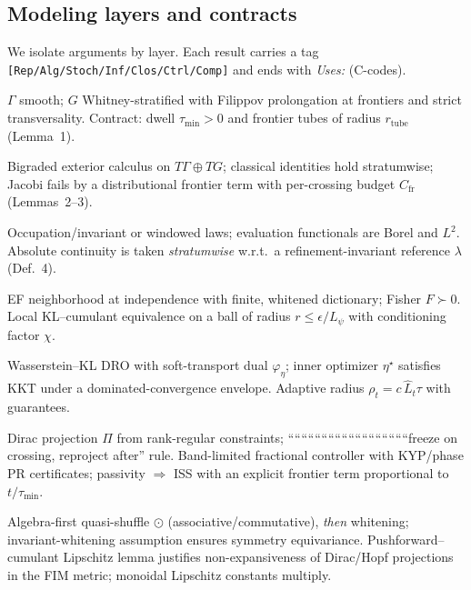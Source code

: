 \subsection*{Modeling layers and contracts}
We isolate arguments by layer. Each result carries a tag \texttt{[Rep/Alg/Stoch/Inf/Clos/Ctrl/Comp]} and ends with \emph{Uses:} (C-codes).

\begin{description}[leftmargin=*,style=nextline]
\item[Representation (Rep).] $\Gamma$ smooth; $G$ Whitney-stratified with Filippov prolongation at frontiers and strict transversality. Contract: dwell $\tau_{\min}>0$ and frontier tubes of radius $r_{\mathrm{tube}}$ (Lemma~1).
\item[Algebra (Alg).] Bigraded exterior calculus on $T\Gamma\oplus TG$; classical identities hold stratumwise; Jacobi fails by a distributional frontier term with per-crossing budget $C_{\mathrm{fr}}$ (Lemmas~2--3).
\item[Stochastic (Stoch).] Occupation/invariant or windowed laws; evaluation functionals are Borel and $L^2$. Absolute continuity is taken \emph{stratumwise} w.r.t.\ a refinement-invariant reference $\lambda$ (Def.~4).
\item[Inference (Inf).] EF neighborhood at independence with finite, whitened dictionary; Fisher $F\!\succ\!0$. Local KL--cumulant equivalence on a ball of radius $r\le \epsilon/L_\psi$ with conditioning factor $\chi$.
\item[Closure (Clos).] Wasserstein--KL DRO with soft-transport dual $\varphi_\eta$; inner optimizer $\eta^\star$ satisfies KKT under a dominated-convergence envelope. Adaptive radius $\rho_t=c\,\widehat L_t\tau$ with guarantees.
\item[Control (Ctrl).] Dirac projection $\Pi$ from rank-regular constraints; ````````````````````````````````````freeze on crossing, reproject after'' rule. Band-limited fractional controller with KYP/phase PR certificates; passivity $\Rightarrow$ ISS with an explicit frontier term proportional to $t/\tau_{\min}$.
\item[Composition (Comp).] Algebra-first quasi-shuffle $\odot$ (associative/commutative), \emph{then} whitening; invariant-whitening assumption ensures symmetry equivariance. Pushforward--cumulant Lipschitz lemma justifies non-expansiveness of Dirac/Hopf projections in the FIM metric; monoidal Lipschitz constants multiply.
\end{description}

